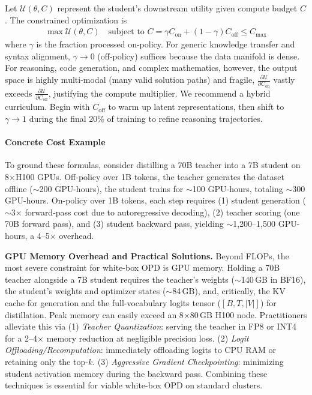 \documentclass{article} %
\begin{document}
Let $\mathcal{U}(\theta, C)$ represent the student's downstream utility given compute budget $C$. The constrained optimization is
\begin{align}
\max \mathcal{U}(\theta, C) \quad \text{subject to } C = \gamma C_{\text{on}} + (1 - \gamma) C_{\text{off}} \le C_{\text{max}}
\end{align}
where $\gamma$ is the fraction processed on-policy. For generic knowledge transfer and syntax alignment, $\gamma \to 0$ (off-policy) suffices because the data manifold is dense. For reasoning, code generation, and complex mathematics, however, the output space is highly multi-modal (many valid solution paths) and fragile, $\frac{\partial \mathcal{U}}{\partial C_{\text{on}}}$ vastly exceeds $\frac{\partial \mathcal{U}}{\partial C_{\text{off}}}$, justifying the compute multiplier. We recommend a hybrid curriculum. Begin with $C_{\text{off}}$ to warm up latent representations, then shift to $\gamma \to 1$ during the final 20\% of training to refine reasoning trajectories.

\paragraph{Concrete Cost Example}
To ground these formulas, consider distilling a 70B teacher into a 7B student on 8$\times$H100 GPUs. Off-policy over 1B tokens, the teacher generates the dataset offline ($\sim$200 GPU-hours), the student trains for $\sim$100 GPU-hours, totaling $\sim$300 GPU-hours. On-policy over 1B tokens, each step requires (1) student generation ($\sim$3$\times$ forward-pass cost due to autoregressive decoding), (2) teacher scoring (one 70B forward pass), and (3) student backward pass, yielding $\sim$1,200--1,500 GPU-hours, a 4--5$\times$ overhead.

\textbf{GPU Memory Overhead and Practical Solutions.} Beyond FLOPs, the most severe constraint for white-box OPD is GPU memory. Holding a 70B teacher alongside a 7B student requires the teacher's weights ($\sim$140\,GB in BF16), the student's weights and optimizer states ($\sim$84\,GB), and, critically, the KV cache for generation and the full-vocabulary logits tensor ($[B, T, |V|]$) for distillation. Peak memory can easily exceed an 8$\times$80\,GB H100 node. Practitioners alleviate this via (1) \textit{Teacher Quantization}: serving the teacher in FP8 or INT4 for a 2--4$\times$ memory reduction at negligible precision loss. (2) \textit{Logit Offloading/Recomputation}: immediately offloading logits to CPU RAM or retaining only the top-$k$. (3) \textit{Aggressive Gradient Checkpointing}: minimizing student activation memory during the backward pass. Combining these techniques is essential for viable white-box OPD on standard clusters.
\end{document}
